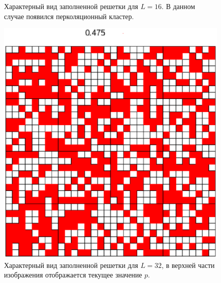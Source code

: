 \documentclass[14pt,a4paper,report]{ncc}
\begin{document}
\begin{figure}[h!]
\begin{center}
\begin{minipage}[h!]{0.45\linewidth}
\caption{Характерный вид заполненной решетки для $L=16$. В данном случае появился перколяционный кластер.}
\label{ris:experimcoded}
\end{minipage}
\end{center}
\end{figure}

\begin{figure}[h!]
\begin{center}
\begin{minipage}[h!]{0.49\linewidth}
\includegraphics[width=1\linewidth]{L32_1}
\caption{Характерный вид заполненной решетки для $L=32$, в верхней части изображения отображается текущее значение $p$.} %
\label{ris:experimoriginal} %
\end{minipage}
\hfill
\begin{minipage}[h!]{0.49\linewidth}

\end{minipage}
\end{center}
\end{figure}
\end{document}
